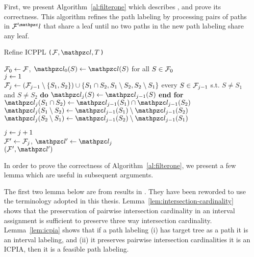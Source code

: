 First, we present Algorithm~\ref{al:filterone} which describes \filteri, and prove its correctness.  This algorithm refines the
path labeling by processing pairs of paths in $\cF^\cl$ that share a
leaf until no two paths in the new path labeling share any leaf.

\begin{algorithm}[h]
  \caption{Refine ICPPL {\tt \filteri($\cF, \cl, T$)}}
  \label{al:filterone} %
  \begin{algorithmic}[\lndisplay]
    \STATE ${\cal F}_0 \leftarrow {\cal F}$, $\cl_0(S) \assign \cl(S)$ for all $S \in {\cal F}_0$\\
    \STATE $j \leftarrow 1$\\
    \label{shareleaf} \STATE ${\cal F}_j \leftarrow ({\cal F}_{j-1} \setminus
    \{S_1, S_2\}) \cup \{S_1 \cap S_2, S_1 \setminus S_2, S_2
    \setminus S_1 \}$ \label{setbreak}   every $S \in
    {\cal F}_{j-1}$ s.t. $S \ne S_1$ and $S \ne
    S_2$ {\bf do} $\cl_j(S) \assign \cl_{j-1}(S)$ {\bf end for}\\

    \STATE $\cl_j(S_1 \cap S_2) \assign \cl_{j-1}(S_1) \cap
    \cl_{j-1}(S_2)$  \STATE $\cl_j(S_1
    \setminus S_2) \assign \cl_{j-1}(S_1) \setminus \cl_{j-1}(S_2)$
     \STATE $\cl_j(S_2
    \setminus S_1) \assign \cl_{j-1}(S_2) \setminus \cl_{j-1}(S_1)$


    \STATE $j \leftarrow j+1$\\
    \ENDWHILE
    \STATE ${\cal F}' \leftarrow {\cal F}_j$, $\cl' \assign \cl_j$\\
    \RETURN $(\cF', \cl')$
  \end{algorithmic}
\end{algorithm}

In order to prove the correctness of Algorithm~\ref{al:filterone}, we
present a few lemma which are useful in subsequent arguments.

The first two lemma below are from results in \cite{nsnrs09}.  They
have been reworded to use the terminology adopted in this
thesis. Lemma~\ref{lem:intersection-cardinality} shows that the
preservation of pairwise intersection cardinality in an interval
assignment is sufficient to preserve three way intersection
cardinality. Lemma~\ref{lem:icpia} shows that if a path labeling (i)
has target tree as a path \ie it is an interval labeling, and (ii) it
preserves pairwise intersection cardinalities \ie it is an ICPIA,
then it is a feasible path labeling.

